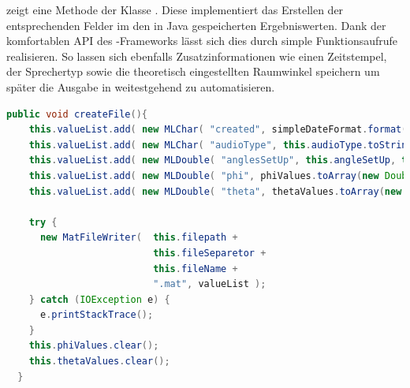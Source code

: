  zeigt eine Methode der Klasse . Diese implementiert das Erstellen der entsprechenden \matlab Felder im den in Java gespeicherten Ergebniswerten. Dank der komfortablen API des -Frameworks lässt sich dies durch simple Funktionsaufrufe realisieren. So lassen sich ebenfalls Zusatzinformationen wie einen Zeitstempel, der Sprechertyp sowie die theoretisch eingestellten Raumwinkel speichern um später die Ausgabe in \matlab weitestgehend zu automatisieren.

\pagebreak

\begin{lstlisting}[caption={Java-Funktion zum Export von Ergebniswerten in im MAT-Format}, label=lst:saveMATFile,frame=htlrb, firstnumber=1, language=java]
  public void createFile(){
    this.valueList.add( new MLChar( "created", simpleDateFormat.format( System.currentTimeMillis() ) ) );
    this.valueList.add( new MLChar( "audioType", this.audioType.toString() ) );
    this.valueList.add( new MLDouble( "anglesSetUp", this.angleSetUp, this.angleSetUp.length) );
    this.valueList.add( new MLDouble( "phi", phiValues.toArray(new Double[phiValues.size()]), phiValues.size()) );
    this.valueList.add( new MLDouble( "theta", thetaValues.toArray(new Double[thetaValues.size()]), thetaValues.size()) );

    try {
      new MatFileWriter(  this.filepath +
                          this.fileSeparetor +
                          this.fileName +
                          ".mat", valueList );
    } catch (IOException e) {
      e.printStackTrace();
    }
    this.phiValues.clear();
    this.thetaValues.clear();	
  }
\end{lstlisting}







